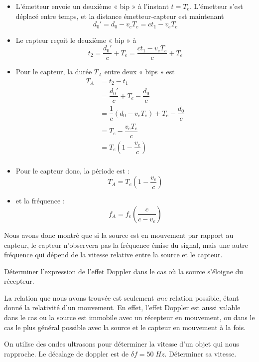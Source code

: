 \documentclass[11pt,a4paper]{article}
\begin{document}
\begin{itemize}
    \item L’émetteur envoie un deuxième « bip » à l’instant $t=T_e$. L’émetteur s’est déplacé entre temps, et la distance émetteur-capteur est maintenant 
    \[ d_0' = d_0 -v_eT_e = ct_1 - v_eT_e \]
    \item Le capteur reçoit le deuxième « bip » à 
    \[t_2 = \dfrac{d_0'}{c} + T_e = \dfrac{ct_1 - v_eT_e}{c} + T_e \]
    \item Pour le capteur, la durée $T_A$  entre deux « bips » est
    \begin{align*}
    T_A &= t_2 - t_1 \\
        &= \dfrac{d_0'}{c} + T_e - \dfrac{d_0}{c} \\
        &= \dfrac{1}{c}\left(d_0 - v_eT_e\right) + T_e - \dfrac{d_0}{c} \\
        &= T_e - \dfrac{v_eT_e}{c} \\
        &= T_e \left(1 - \dfrac{v_e}{c}\right) \\
    \end{align*}
    \item Pour le capteur donc, la période est : 
    \[ T_A = T_e \left(1 - \dfrac{v_e}{c}\right) \]
    \item et la fréquence : 
    \[ f_A = f_e\left( \dfrac{c}{c - v_e}\right) \]
\end{itemize}
 
Nous avons donc montré que si la source est en mouvement par rapport au capteur, le capteur n’observera pas la fréquence émise du signal, mais une autre fréquence qui dépend de la vitesse relative entre la source et le capteur. 

\begin{exo}
Déterminer l'expression de l'effet Doppler dans le cas où la source s'éloigne du récepteur. 
\vspace{4cm}
\end{exo}
\begin{rmrq}
La relation que nous avons trouvée est seulement \textit{une} relation possible, étant donné la relativité d'un mouvement. En effet, l'effet Doppler est aussi valable dans le cas ou la source est immobile avec un récepteur en mouvement, ou dans le cas le plus général possible avec la source et le capteur en mouvement à la fois. 
\end{rmrq}

\begin{exo}
On utilise des ondes ultrasons pour déterminer la vitesse d'un objet qui nous rapproche. Le décalage de doppler est de $\delta f = 50\; Hz$. Déterminer sa vitesse. 
\vspace{4cm}

\end{exo}
\end{document}
